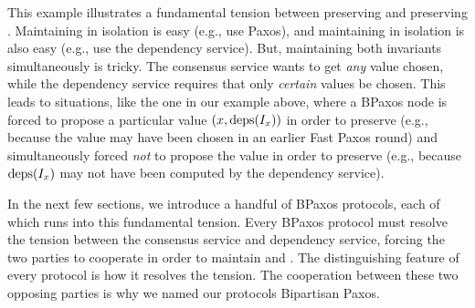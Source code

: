 This example illustrates a fundamental tension between preserving
 and preserving .
Maintaining  in isolation is easy (e.g., use Paxos),
and maintaining  in isolation is also easy (e.g., use
the dependency service). But, maintaining both invariants simultaneously is
tricky. The consensus service wants to get \emph{any} value chosen, while the
dependency service requires that only \emph{certain} values be chosen.
%
This leads to situations, like the one in our example above, where a BPaxos
node is forced to propose a particular value $(x, \text{deps}(I_x))$ in order to
preserve  (e.g., because the value may have been
chosen in an earlier Fast Paxos round) and simultaneously forced \emph{not} to
propose the value in order to preserve  (e.g.,
because $\text{deps}(I_x)$ may not have been computed by the dependency service).

In the next few sections, we introduce a handful of BPaxos protocols, each of
which runs into this fundamental tension. Every BPaxos protocol must resolve
the tension between the consensus service and dependency service, forcing the
two parties to cooperate in order to maintain  and
. The distinguishing feature of every protocol is how
it resolves the tension.  The cooperation between these two opposing parties is
why we named our protocols Bipartisan Paxos.
